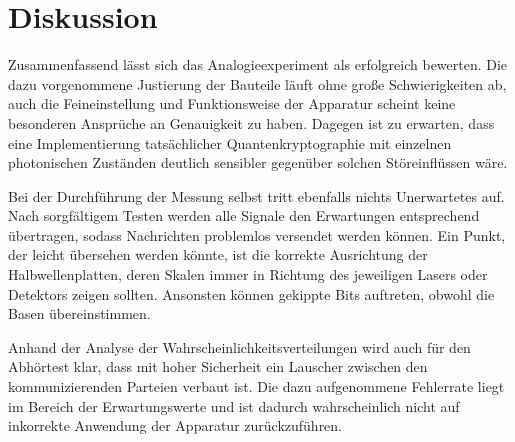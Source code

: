 \section{Diskussion}

Zusammenfassend lässt sich das Analogieexperiment als erfolgreich bewerten. Die dazu vorgenommene
Justierung der Bauteile läuft ohne große Schwierigkeiten ab, auch die Feineinstellung und Funktionsweise
der Apparatur scheint keine besonderen Ansprüche an Genauigkeit zu haben. Dagegen ist zu erwarten, dass
eine Implementierung tatsächlicher Quantenkryptographie mit einzelnen photonischen Zuständen deutlich
sensibler gegenüber solchen Störeinflüssen wäre.

Bei der Durchführung der Messung selbst tritt ebenfalls nichts Unerwartetes auf. Nach sorgfältigem
Testen werden alle Signale den Erwartungen entsprechend übertragen, sodass Nachrichten problemlos
versendet werden können. Ein Punkt, der leicht übersehen werden könnte, ist die korrekte Ausrichtung
der Halbwellenplatten, deren Skalen immer in Richtung des jeweiligen Lasers oder Detektors zeigen
sollten. Ansonsten können gekippte Bits auftreten, obwohl die Basen übereinstimmen.

Anhand der Analyse der Wahrscheinlichkeitsverteilungen wird auch für den Abhörtest klar, dass mit
hoher Sicherheit ein Lauscher zwischen den kommunizierenden Parteien verbaut ist. Die dazu aufgenommene
Fehlerrate liegt im Bereich der Erwartungswerte und ist dadurch wahrscheinlich nicht auf inkorrekte
Anwendung der Apparatur zurückzuführen.
